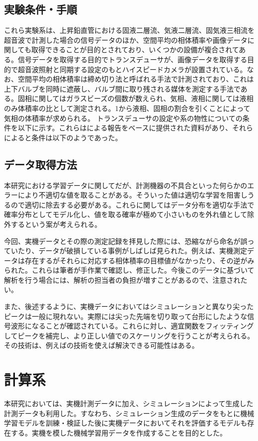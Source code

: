 \documentclass[uplatex]{suribt}
\begin{document}
\section{実験条件・手順}
これら実験系は、上昇鉛直管における固液二層流、気液二層流、固気液三相流を超音波で計測した場合の信号データのほか、空間平均の相体積率や画像データに関しても取得できることが目的とされており、いくつかの設備が複合されてある。信号データを取得する目的でトランスデューサが、画像データを取得する目的で超音波照射と同期する設定のもとハイスピードカメラが設置されている。なお、空間平均の相体積率は締め切り法と呼ばれる手法で計測されており、これは上下バルブを同時に遮蔽し、バルブ間に取り残される媒体を測定する手法である。固相に関してはガラスビーズの個数が数えられ、気相、液相に関しては液相のみ体積率の比として測定される。1から液相、固相の割合を引くことによって気相の体積率が求められる。
トランスデューサの設定や系の物性についての条件を以下に示す。これらは\cite{park2022gas}による報告をベースに提供された資料があり、それらによると条件は以下のようであった。

\section{データ取得方法}
本研究における学習データに関してだが、計測機器の不具合といった何らかのエラーにより不適切な値を取ることがある。そういった値は適切な学習を阻害しうるので適切に除去する必要がある。これらに関してはデータ分布を適切な手法で確率分布としてモデル化し、値を取る確率が極めて小さいものを外れ値として除外するという案が考えられる。

今回、実機データとその際の測定記録を拝見した際には、恐縮ながら命名が誤っていたり、データが破損している事例がしばしば見られた。例えば、実機測定データは存在するがそれらに対応する相体積率の目標値がなかったり、その逆がみられた。これらは筆者が手作業で確認し、修正した。今後このデータに基づいて解析を行う場合には、解析の担当者の負担が増すことがあるので、注意されたい。

また、後述するように、実機データにおいてはシミュレーションと異なり尖ったピークは一般に現れない。実際には尖った先端を切り取って台形にしたような信号波形になることが確認されている。これらに対し、適宜関数をフィッティングしてピークを補完し、より正しい値でのスケーリングを行うことが考えられる。その技術は、例えば\cite{kyodaisenpai}の技術を使えば解決できる可能性はある。
\chapter{計算系}
本研究においては、実機計測データに加え、シミュレーションによって生成した計測データも利用した。すなわち、シミュレーション生成のデータをもとに機械学習モデルを訓練・検証した後に実機データにおいてそれを評価するモデルも存在する。実機を模した機械学習用データを作成することを目的とした。
\end{document}
